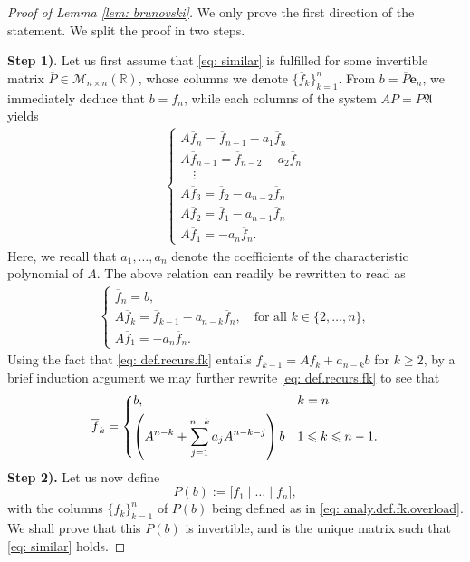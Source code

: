 \documentclass[11pt, a4paper, reqno]{amsart}
\newcommand{\R}{\mathbb{R}}
\theoremstyle{plain}
\numberwithin{equation}{section}
\begin{document}
	\begin{proof}[Proof of Lemma \ref{lem: brunovski}] We only prove the first direction of the statement. 
	We split the proof in two steps.
\smallskip

\noindent \textbf{Step 1)}. Let us first assume that \eqref{eq: similar} is fulfilled for some invertible matrix $\overline{P}\in\mathcal{M}_{n\times n}(\R)$, whose columns we denote $\{\overline{f}_k\}_{k=1}^n$. 
From $b=\overline{P}\mathbf{e}_n$, we immediately deduce that $b = \overline{f}_n$, while each columns of the system $A\overline{P} = \overline{P}\mathfrak{A}$ yields 
\begin{align}
\begin{cases}
A \overline{f}_n = \overline{f}_{n-1} - a_{1}\overline{f}_n \\
A \overline{f}_{n-1} = \overline{f}_{n-2} - a_{2}\overline{f}_{n} \\
\quad \vdots\\
A \overline{f}_3 = \overline{f}_2 - a_{n-2} \overline{f}_n\\
A \overline{f}_2 = \overline{f}_1 - a_{n-1}\overline{f}_n\\
A \overline{f}_1 = -a_n \overline{f}_n.
\end{cases}
\end{align}
Here, we recall that $a_1, \ldots, a_n$ denote the coefficients of the characteristic polynomial of $A$.
The above relation can readily be rewritten to read as
\begin{align} \label{eq: def.recurs.fk}
\begin{cases}
\overline{f}_n = b,\\
A\overline{f}_{k} = \overline{f}_{k-1} - a_{n-k}\overline{f}_n, \quad \text{for all }k \in \{2, \ldots, n\},\\
A\overline{f}_1 = -a_n\overline{f}_n.
\end{cases}
\end{align}
Using the fact that \eqref{eq: def.recurs.fk} entails $\overline{f}_{k-1} = A\overline{f}_{k} + a_{n-k}b$ for $k\geqslant2$, by a brief induction argument we may further rewrite \eqref{eq: def.recurs.fk} to see that
\begin{equation} \label{eq: analy.def.fk.overload}
\overline{f}_k =
	\begin{dcases}
	b, &k=n \\
	\left(A^{n-k} + \sum_{j=1}^{n-k} a_{j} A^{n-k-j}\right) b &1\leqslant k \leqslant n-1.
	\end{dcases}
	\end{equation}
\textbf{Step 2).} Let us now define 
\begin{equation} \label{eq: P.def.proof}
P(b):= \Big[f_1 \mid \ldots \mid f_n\Big],
\end{equation}
with the columns $\{f_k\}_{k=1}^n$ of $P(b)$ being defined as in \eqref{eq: analy.def.fk.overload}. We shall prove that this $P(b)$ is invertible, and is the unique matrix such that \eqref{eq: similar} holds.


\end{proof}
\end{document}
